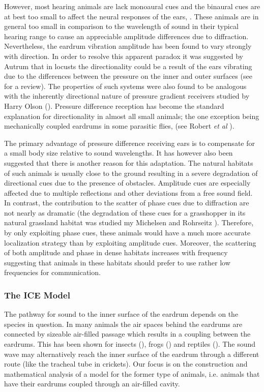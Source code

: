 However, most hearing animals are lack monoaural cues and the binaural
cues are at best too small to affect the neural responses of the ears, \cite{michelsen1}. These animals are in general too small in comparison
to the wavelength of sound in their typical hearing range to cause an appreciable amplitude differences due to diffraction. Nevertheless, 
the eardrum vibration amplitude has been found to vary strongly with direction. In order to resolve this apparent paradox it was
suggested by Autrum \cite{autrumjcomphys} that in locusts the directionality could be a result of the ears vibrating due to the
differences between the pressure on the inner and outer surfaces (see \cite{michelsenlarsen} for a review).  The properties of such systems were also found to be analogous with the inherently directional 
nature of pressure gradient receivers studied by Harry Olson (\cite{olsonmichrophones}). Pressure difference reception has
become the standard explanation for directionality in almost all small animals; the one exception being mechanically coupled
eardrums in some parasitic flies, (see Robert \emph{et al} \cite{roberthoy}).

The primary advantage of pressure difference receiving ears is to compensate for a small body size relative to sound wavelengths. It has
however also been suggested that there is another reason for this adaptation. The natural habitats of such animals
is usually close to the ground resulting in a severe degradation of directional cues due to the presence of obstacles. Amplitude cues are especially affected due to multiple reflections and other deviations
from a free sound field. In contrast, the contribution to the scatter of phase cues due to diffraction are not nearly as dramatic (the degradation
of these cues for a grasshopper in its natural grassland habitat was studied my Michelsen and Rohrseitz \cite{michelsenrohrseitz97}). Therefore,
 by only exploiting phase cues, these animals would have a much more accurate localization strategy than by exploiting amplitude cues. Moreover, 
 the scattering of both amplitude and phase in dense habitats increases with frequency suggesting that animals in these habitats should prefer to
 use rather low frequencies for communication. 

 \subsubsection{The ICE Model}
The pathway for sound to the inner surface of the eardrum depends on the species in question. In many animals the air spaces behind the eardrums are
connected by sizeable air-filled passage which results in a coupling between the eardrums. This has been shown for 
insects (\cite{michelsenbiophysics}), frogs (\cite{jorgensenanurans}) and reptiles (\cite{dalsgaardmanley1}). The sound wave
may alternatively reach the inner surface of the eardrum through a different route (like the tracheal tube in crickets). Our focus
is on the construction and mathematical analysis of a model for the former type of animals, i.e. animals that have their eardrums coupled through an air-filled cavity.

